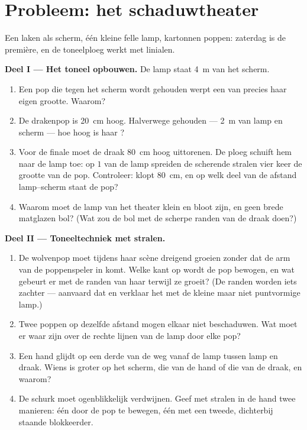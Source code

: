\section{Probleem: het schaduwtheater}

\begin{problem}\label{pb:g6:light-propagation:1}
Een laken als scherm, één kleine felle lamp, kartonnen poppen: zaterdag
is de première, en de toneelploeg werkt met linialen.

\medskip\noindent\textbf{Deel I --- Het toneel opbouwen.}
De lamp staat \qty{4}{m} van het scherm.
\begin{enumerate}
  \item Een pop die tegen het scherm wordt gehouden werpt een
         van precies haar eigen grootte. Waarom?
  \item De drakenpop is \qty{20}{cm} hoog. Halverwege gehouden ---
        \qty{2}{m} van lamp en scherm --- hoe hoog is haar
        ?
  \item Voor de finale moet de draak \qty{80}{cm} hoog uittorenen. De
        ploeg schuift hem naar de lamp toe: op $1$  van de lamp
        spreiden de scherende stralen vier keer de grootte van de
        pop. Controleer: klopt \qty{80}{cm}, en op welk deel van de
        afstand lamp--scherm staat de pop?
  \item Waarom moet de lamp van het theater klein en bloot zijn, en
        geen brede matglazen bol? (Wat zou de bol met de scherpe
        randen van de draak doen?)
\end{enumerate}

\medskip\noindent\textbf{Deel II --- Toneeltechniek met stralen.}
\begin{enumerate}[resume]
  \item De wolvenpop moet tijdens haar scène dreigend groeien zonder
        dat de arm van de poppenspeler in  komt. Welke kant op
        wordt de pop bewogen, en wat gebeurt er met de randen van
        haar  terwijl ze groeit? (De randen worden iets
        zachter --- aanvaard dat en verklaar het met de kleine maar
        niet puntvormige lamp.)
  \item Twee poppen op dezelfde afstand mogen elkaar niet
        beschaduwen. Wat moet er waar zijn over de rechte lijnen van
        de lamp door elke pop?
  \item Een hand glijdt op een derde van de weg vanaf de lamp tussen
        lamp en draak. Wiens  is groter op het scherm, die van
        de hand of die van de draak, en waarom?
  \item De schurk moet ogenblikkelijk verdwijnen. Geef met stralen in
        de hand twee manieren: één door de pop te bewegen, één met
        een tweede, dichterbij staande blokkeerder.
\end{enumerate}


\end{problem}
